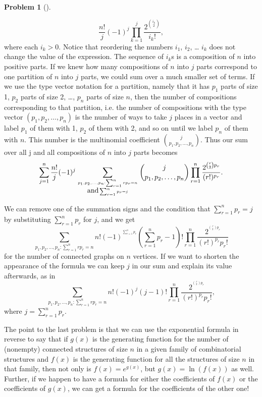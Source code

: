\documentclass[10pt,]{book}
\theoremstyle{plain}
\theoremstyle{definition}
\newtheorem{activity}[project]{Problem}
\theoremstyle{definition}
\numberwithin{equation}{chapter}
\begin{document}
\begin{activity}[]
\begin{enumerate}[font=\bfseries,label=(\alph*),ref=\alph*]
\begin{equation*}
\frac{n!}{j}(-1)^j\prod_{k=1}^j \frac{2^{\binom{i_k}{2}}
}{i_k!},
\end{equation*}
where each \(i_k>0\). Notice that reordering the numbers \(i_1\), \(i_2\), \dots{} \(i_k\) does not change the value of the expression. The sequence of \(i_k\)s is a composition of \(n\) into positive parts. If we knew how many compositions of \(n\) into \(j\) parts correspond to one partition of \(n\) into \(j\) parts, we could sum over a much smaller set of terms. If we use the type vector notation for a partition, namely that it has \(p_1\) parts of size 1, \(p_2\) parts of size 2, \dots{}, \(p_n\) parts of size \(n\), then the number of compositions corresponding to that partition, i.e. the number of compositions with the type vector \((p_1,p_2, \ldots, p_n)\) is the number of ways to take \(j\) places in a vector and label \(p_1\) of them with 1, \(p_2\) of them with 2, and so on until we label \(p_n\) of them with \(n\). This number is the multinomial coefficient \(\binom{j}{p_1,p_2,\ldots, p_n}\). Thus our sum over all j and all compositions of \(n\) into \(j\) parts becomes%
\begin{equation*}
\sum_{j=1}^n \frac{n!}{j}(-1)^j\sum_{{p_1,p_2,\ldots,p_n: \sum_{r=1}^n
rp_r =n \atop \mbox{and}  \sum_{r=1}^n p_r =j}}\binom{j}{p_1, p_2, \ldots,
p_n}
\prod_{r=1}^n\frac{2^{{\binom{r}{2}p_r}}
}{(r!)^{p_r}}.
\end{equation*}
%
\par
We can remove one of the summation signs and the condition that \(\sum_{r=1}^n p_r=j\) by substituting \(\sum_{r=1}^n p_r\) for \(j\), and we get%
\begin{equation*}
\sum_{{p_1,p_2,\ldots,p_n: \sum_{r=1}^n
rp_r =n }}{n!}(-1)^{^{\sum_{r=1}^n p_r}}\left(\sum_{r=1}^n p_r -1\right)!
\prod_{r=1}^n\frac{2^{^{\binom{r}{2}p_r}}
}{(r!)^{p_r}p_r!}
\end{equation*}
for the number of connected graphs on \(n\) vertices. If we want to shorten the appearance of the formula we can keep \(j\) in our sum and explain its value afterwards, as in%
\begin{equation*}
\sum_{{p_1,p_2,\ldots,p_n: \sum_{r=1}^n
rp_r =n }}{n!}(-1)^j(j-1)!
\prod_{r=1}^n \frac{2^{^{\binom{r}{2}p_r}}
}{(r!)^{p_r}p_r!},
\end{equation*}
where \(j=\sum_{r=1}^n p_r\).%
\end{enumerate}
\end{activity}
The point to the last problem is that we can use the exponential formula in reverse to say that if \(g(x)\) is the generating function for the number of (nonempty) connected structures of size \(n\) in a given family of combinatorial structures and \(f(x)\) is the generating function for all the structures of size \(n\) in that family, then not only is \(f(x) = e^{g(x)}\), but \(g(x) = \ln(f(x))\) as well. Further, if we happen to have a formula for either the coefficients of \(f(x)\) or the coefficients of \(g(x)\), we can get a formula for the coefficients of the other one!%
\typeout{************************************************}
\typeout{************************************************}
\end{document}
